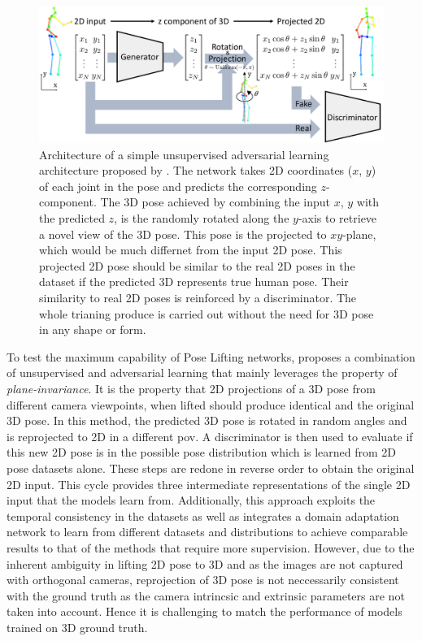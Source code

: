 \begin{figure}[h]
    \centering
    \includegraphics[width=\linewidth]{figures/background/adverserial_arch.pdf}
    \caption{Architecture of a simple unsupervised adversarial learning architecture proposed by \cite{unsupervisedAdversarial}. The network takes 2D coordinates ($x$, $y$) of each joint in the pose and predicts the corresponding $z$-component. The 3D pose achieved by combining the input $x$, $y$ with the predicted $z$, is the randomly rotated along the $y$-axis to retrieve a novel view of the 3D pose. This pose is the projected to $xy$-plane, which would be much differnet from the input 2D pose. This projected 2D pose should be similar to the real 2D poses in the dataset if the predicted 3D represents true human pose. Their similarity to real 2D poses is reinforced by a discriminator. The whole trianing produce is carried out without the need for 3D pose in any shape or form.}
    \label{fig:adverserial_arch}
\end{figure}

To test the maximum capability of Pose Lifting networks, \cite{amazon1} proposes a combination of unsupervised and adversarial learning that mainly leverages the property of \textit{plane-invariance}. It is the property that 2D projections of a 3D pose from different camera viewpoints, when lifted should produce identical and the original 3D pose. In this method, the predicted 3D pose is rotated in random angles and is reprojected to 2D in a different \ac{pov}. A discriminator is then used to evaluate if this new 2D pose is in the possible pose distribution which is learned from 2D pose datasets alone. These steps are redone in reverse order to obtain the original 2D input. This cycle provides three intermediate representations of the single 2D input that the models learn from. Additionally, this approach exploits the temporal consistency in the datasets as well as integrates a domain adaptation network to learn from different datasets and distributions to achieve comparable results to that of the methods that require more supervision. However, due to the inherent ambiguity in lifting 2D pose to 3D and as the images are not captured with orthogonal cameras, reprojection of 3D pose is not neccessarily consistent with the ground truth as the camera intrincsic and extrinsic parameters are not taken into account. Hence it is challenging to match the performance of models trained on 3D ground truth.

